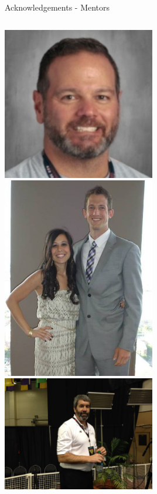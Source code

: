 \documentclass[aspectratio=169]{beamer}
\begin{document}
\begin{frame}{Acknowledgements - Mentors}
    \begin{columns}
            \centering
            \includegraphics[width=0.5\textwidth]{people/coaches/cullen.png}
            \includegraphics[width=0.5\textwidth]{people/coaches/maly.png}
            \centering
            \includegraphics[width=0.5\textwidth]{people/coaches/pancoast.png}

\end{columns}
\end{frame}
\end{document}
